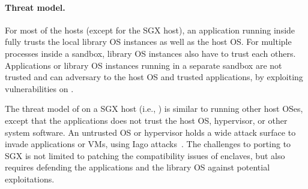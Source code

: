 \paragraph{Threat model.}
For most of the \graphene{} hosts (except for the SGX host),
an application running inside \graphene{} fully trusts the local library OS instances
as well as the host OS.
For multiple processes inside a sandbox,
library OS instances also have to trust each others.
Applications or library OS instances running in a separate sandbox
are not trusted
and can adversary to the host OS and
trusted applications,
by exploiting vulnerabilities on \thehostabi{}.




The threat model of \graphene{} on a SGX host (i.e., \graphenesgx{})
is similar to running other host OSes, except that the applications does not trust the host OS, hypervisor, or other system software.
An untrusted OS or hypervisor
holds a wide attack surface to invade applications or VMs,
using Iago attacks~\cite{checkoway13iago}.
The challenges to porting \graphene{} to SGX is not limited to patching the compatibility issues of enclaves, but also requires defending the applications and the library OS against potential exploitations.







